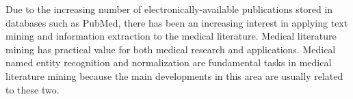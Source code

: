 Due  to the increasing number of electronically-available publications stored in databases such as PubMed, there has been an increasing interest in applying text mining and information extraction to the medical literature. 
Medical literature mining has practical value for both medical research and applications. Medical named entity recognition and normalization are fundamental tasks in medical literature mining because the main developments in this area are usually related to these two.


